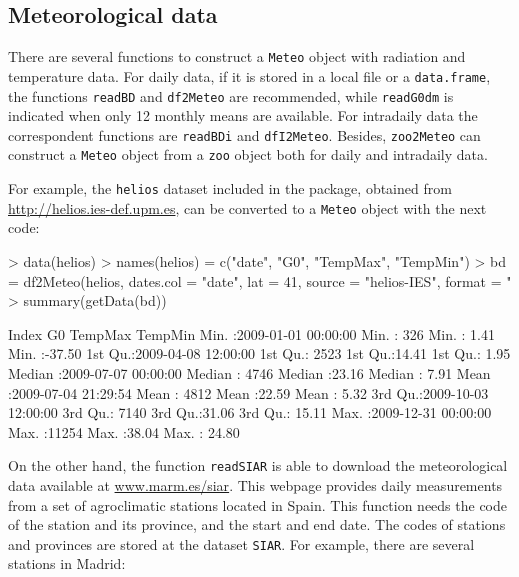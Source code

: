 \documentclass[oldfontcommands,a4paper]{memoir}
\renewenvironment{Schunk}{\vspace{\topsep}}{\vspace{\topsep}}
\begin{document}
\subsection{Meteorological data}

There are several functions to construct a \texttt{Meteo} object with radiation and temperature data.
For daily data, if it is stored in a local file or a  \texttt{data.frame}, the functions  \texttt{readBD} and \texttt{df2Meteo} are recommended, while \texttt{readG0dm} is indicated when only 12 monthly means are available. For intradaily data the correspondent functions are \texttt{readBDi} and \texttt{dfI2Meteo}. Besides, \texttt{zoo2Meteo} can construct a \texttt{Meteo} object from a \texttt{zoo} object both for daily and intradaily data.

For example, the \texttt{helios} dataset included in the package, obtained from \url{http://helios.ies-def.upm.es}, can be converted to a \texttt{Meteo} object with the next code:
\begin{Schunk}
\begin{Sinput}
> data(helios)
> names(helios) = c("date", "G0", "TempMax", "TempMin")
> bd = df2Meteo(helios, dates.col = "date", lat = 41, source = "helios-IES", 
     format = "%Y/%m/%d")
> summary(getData(bd))
\end{Sinput}
\begin{Soutput}
     Index                           G0           TempMax         TempMin      
 Min.   :2009-01-01 00:00:00   Min.   :  326   Min.   : 1.41   Min.   :-37.50  
 1st Qu.:2009-04-08 12:00:00   1st Qu.: 2523   1st Qu.:14.41   1st Qu.:  1.95  
 Median :2009-07-07 00:00:00   Median : 4746   Median :23.16   Median :  7.91  
 Mean   :2009-07-04 21:29:54   Mean   : 4812   Mean   :22.59   Mean   :  5.32  
 3rd Qu.:2009-10-03 12:00:00   3rd Qu.: 7140   3rd Qu.:31.06   3rd Qu.: 15.11  
 Max.   :2009-12-31 00:00:00   Max.   :11254   Max.   :38.04   Max.   : 24.80  
\end{Soutput}
\end{Schunk}

On the other hand, the function  \texttt{readSIAR} is able to download the meteorological data 
available at \url{www.marm.es/siar}.
This webpage provides daily measurements from a set of agroclimatic stations 
located in Spain. This function needs the code of the station and its province, 
and the start and end date. The codes of stations and provinces are stored at the
dataset \texttt{SIAR}. For example, there are several stations in Madrid:
\end{document}
